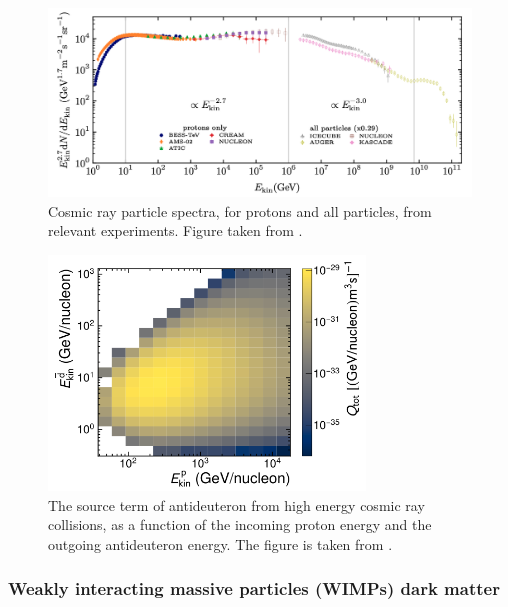 \begin{figure}
    \centering
    \includegraphics[width=\textwidth]{figures/ThomasP_cosmic_ray_spectra.png}

    \caption{Cosmic ray particle spectra, for protons and all particles, from relevant experiments. Figure taken from \cite{ThomasThesis}. }
    \label{fig:CR_spectra_Thomas}
\end{figure}
\begin{figure}
    \centering
    \includegraphics[width=0.75\textwidth]{figures/dbar_2dplot_production.png}
    \caption{The source term of antideuteron from high energy cosmic ray collisions, as a function of the incoming proton energy and the outgoing antideuteron energy. The figure is taken from \cite{Serksnyte:2022onw}.}
    \label{fig:dbar_2d_source_CR}
\end{figure}




\subsubsection{Weakly interacting massive particles (WIMPs) dark matter}\label{sec:WIMPS}

